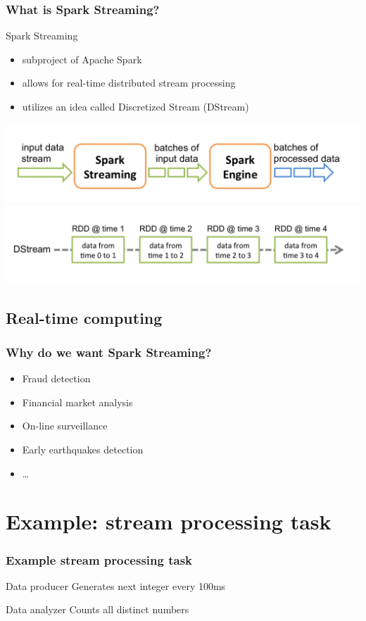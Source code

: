 \documentclass{beamer}
\begin{document}
\begin{frame}
\frametitle{What is Spark Streaming?}

\begin{block}{Spark Streaming}
\begin{itemize}
	\item subproject of Apache Spark\texttrademark
	\item allows for real-time distributed stream processing
	\item utilizes an idea called Discretized Stream (DStream)
\end{itemize}
\vspace{-1em}
\includegraphics[width=\textwidth]{img/streaming-flow.png}
\vspace{-1em}
\includegraphics[width=\textwidth]{img/streaming-dstream.png}

\end{block}
\end{frame}

\subsection*{Real-time computing}
\begin{frame}
\frametitle{Why do we want Spark Streaming?}
	\begin{itemize}
		\item Fraud detection
		\item Financial market analysis
		\item On-line surveillance
		\item Early earthquakes detection
		\item \ldots
	\end{itemize}
\end{frame}

\section{Example: stream processing task}
\begin{frame}
\frametitle{Example stream processing task}
\begin{block}{Data producer}
	Generates next integer every 100ms
\end{block}
\begin{block}{Data analyzer}
	Counts all distinct numbers
\end{block}
\end{frame}
\end{document}
